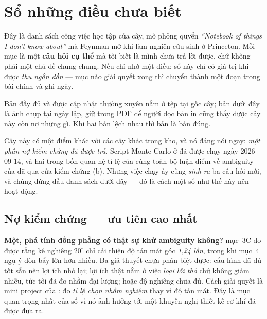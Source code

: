 \documentclass[marker.tex]{subfiles}
\begin{document}
\chapter*{Sổ những điều chưa biết}

\begin{tomtat}
Đây là danh sách công việc học tập của cây, mô phỏng quyển \emph{``Notebook of things I don't know about''} mà Feynman mở khi làm nghiên cứu sinh ở Princeton. Mỗi mục là một \textbf{câu hỏi cụ thể} mà tôi biết là mình chưa trả lời được, chứ không phải một chủ đề chung chung. Nếu chỉ nhớ một điều: sổ này chỉ có giá trị khi được \emph{thu ngắn dần} --- mục nào giải quyết xong thì chuyển thành một đoạn trong bài chính và ghi ngày.
\end{tomtat}

Bản đầy đủ và được cập nhật thường xuyên nằm ở tệp  tại gốc cây; bản dưới đây là ảnh chụp tại ngày lập, giữ trong PDF để người đọc bản in cũng thấy được cây này còn nợ những gì. Khi hai bản lệch nhau thì bản  là bản đúng.

Cây này có một điểm khác với các cây khác trong kho, và nó đáng nói ngay: \emph{một phần nợ kiểm chứng đã được trả}. Script Monte Carlo ở  đã được chạy ngày 2026-09-14, và hai trong bốn quan hệ tỉ lệ của  cùng toàn bộ luận điểm về ambiguity của  đã qua cửa kiểm chứng (b). Nhưng việc chạy ấy cũng \emph{sinh ra} ba câu hỏi mới, và chúng đứng đầu danh sách dưới đây --- đó là cách một sổ như thế này nên hoạt động.

\section*{Nợ kiểm chứng --- ưu tiên cao nhất}

\textbf{Một, phá tính đồng phẳng có thật sự khử ambiguity không?}  mục~3C đo được rằng kê nghiêng \(20^\circ\) chỉ cải thiện độ tản mát góc \emph{1,24 lần}, trong khi  mục~4 ngụ ý đòn bẩy lớn hơn nhiều. Ba giả thuyết chưa phân biệt được: cấu hình đã đủ tốt sẵn nên lợi ích nhỏ lại; lợi ích thật nằm ở việc \emph{loại lỗi thô} chứ không giảm nhiễu, tức tôi đã đo nhầm đại lượng; hoặc độ nghiêng chưa đủ. Cách giải quyết là mini project của : đo \emph{tỉ lệ chọn nhầm nghiệm} thay vì độ tản mát. Đây là mục quan trọng nhất của sổ vì nó ảnh hưởng tới một khuyến nghị thiết kế cơ khí đã được đưa ra.
\end{document}
